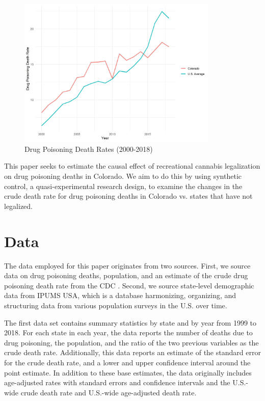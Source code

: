 \documentclass{article}
\begin{document}
\begin{figure}[H]
	\begin{center}
		\includegraphics[width=0.85\textwidth]{death_rates_trend}
	\end{center}
	\caption{Drug Poisoning Death Rates (2000-2018)}
	\label{fig:death_rates_trend}
\end{figure}

This paper seeks to estimate the causal effect of recreational cannabis legalization on drug poisoning deaths in Colorado. We aim to do this by using synthetic control, a quasi-experimental research design, to examine the changes in the crude death rate for drug poisoning deaths in Colorado vs. states that have not legalized. 

\section{Data}

The data employed for this paper originates from two sources. First, we source data on drug poisoning deaths, population, and an estimate of the crude drug poisoning death rate from the CDC \citep{cdc}. Second, we source state-level demographic data from IPUMS USA, which is a database harmonizing, organizing, and structuring data from various population surveys in the U.S. over time\citep{ipums}.

The first data set contains summary statistics by state and by year from 1999 to 2018. For each state in each year, the data reports the number of deaths due to drug poisoning, the population, and the ratio of the two previous variables as the crude death rate. Additionally, this data reports an estimate of the standard error for the crude death rate, and a lower and upper confidence interval around the point estimate. In addition to these base estimates, the data originally includes age-adjusted rates with standard errors and confidence intervals and the U.S.-wide crude death rate and U.S.-wide age-adjusted death rate. 
\end{document}
